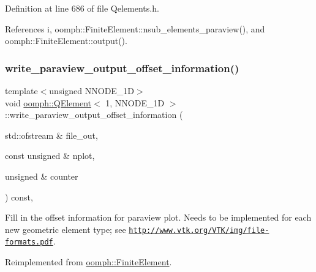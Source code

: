 Definition at line 686 of file Qelements.\+h.



References i, oomph\+::\+Finite\+Element\+::nsub\+\_\+elements\+\_\+paraview(), and oomph\+::\+Finite\+Element\+::output().

\mbox{\label{classoomph_1_1QElement_3_011_00_01NNODE__1D_01_4_a2ecd9caf79d1b2879dc0bdc92d8be525}} 
\subsubsection{\texorpdfstring{write\+\_\+paraview\+\_\+output\+\_\+offset\+\_\+information()}{write\_paraview\_output\_offset\_information()}}
{\footnotesize\ttfamily template$<$unsigned N\+N\+O\+D\+E\+\_\+1D$>$ \\
void \hyperlink{classoomph_1_1QElement}{oomph\+::\+Q\+Element}$<$ 1, N\+N\+O\+D\+E\+\_\+1D $>$\+::write\+\_\+paraview\+\_\+output\+\_\+offset\+\_\+information (\begin{DoxyParamCaption}\item[{std\+::ofstream \&}]{file\+\_\+out,  }\item[{const unsigned \&}]{nplot,  }\item[{unsigned \&}]{counter }\end{DoxyParamCaption}) const\hspace{0.3cm}{\ttfamily [inline]}, {\ttfamily [virtual]}}



Fill in the offset information for paraview plot. Needs to be implemented for each new geometric element type; see \href{http://www.vtk.org/VTK/img/file-formats.pdf}{\tt http\+://www.\+vtk.\+org/\+V\+T\+K/img/file-\/formats.\+pdf}. 



Reimplemented from \hyperlink{classoomph_1_1FiniteElement_afed006dd5b9ab6bd613d8496e6048abf}{oomph\+::\+Finite\+Element}.



